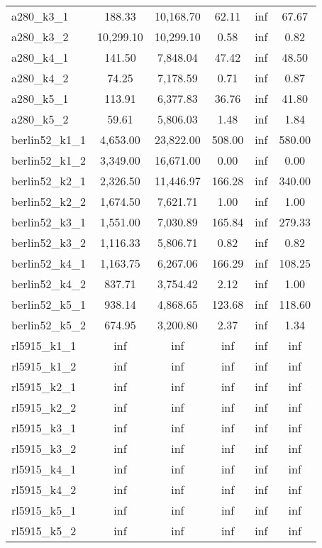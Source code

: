 \documentclass{article}
\begin{document}
\begin{center}
\begin{tabular}{|l|c|c|c|c|c|}
a280\_k3\_1 & 188.33 & 10,168.70 & 62.11 & inf & 67.67 \\
a280\_k3\_2 & 10,299.10 & 10,299.10 & 0.58 & inf & 0.82 \\
a280\_k4\_1 & 141.50 & 7,848.04 & 47.42 & inf & 48.50 \\
a280\_k4\_2 & 74.25 & 7,178.59 & 0.71 & inf & 0.87 \\
a280\_k5\_1 & 113.91 & 6,377.83 & 36.76 & inf & 41.80 \\
a280\_k5\_2 & 59.61 & 5,806.03 & 1.48 & inf & 1.84 \\
berlin52\_k1\_1 & 4,653.00 & 23,822.00 & 508.00 & inf & 580.00 \\
berlin52\_k1\_2 & 3,349.00 & 16,671.00 & 0.00 & inf & 0.00 \\
berlin52\_k2\_1 & 2,326.50 & 11,446.97 & 166.28 & inf & 340.00 \\
berlin52\_k2\_2 & 1,674.50 & 7,621.71 & 1.00 & inf & 1.00 \\
berlin52\_k3\_1 & 1,551.00 & 7,030.89 & 165.84 & inf & 279.33 \\
berlin52\_k3\_2 & 1,116.33 & 5,806.71 & 0.82 & inf & 0.82 \\
berlin52\_k4\_1 & 1,163.75 & 6,267.06 & 166.29 & inf & 108.25 \\
berlin52\_k4\_2 & 837.71 & 3,754.42 & 2.12 & inf & 1.00 \\
berlin52\_k5\_1 & 938.14 & 4,868.65 & 123.68 & inf & 118.60 \\
berlin52\_k5\_2 & 674.95 & 3,200.80 & 2.37 & inf & 1.34 \\
rl5915\_k1\_1 & inf & inf & inf & inf & inf \\
rl5915\_k1\_2 & inf & inf & inf & inf & inf \\
rl5915\_k2\_1 & inf & inf & inf & inf & inf \\
rl5915\_k2\_2 & inf & inf & inf & inf & inf \\
rl5915\_k3\_1 & inf & inf & inf & inf & inf \\
rl5915\_k3\_2 & inf & inf & inf & inf & inf \\
rl5915\_k4\_1 & inf & inf & inf & inf & inf \\
rl5915\_k4\_2 & inf & inf & inf & inf & inf \\
rl5915\_k5\_1 & inf & inf & inf & inf & inf \\
rl5915\_k5\_2 & inf & inf & inf & inf & inf \\
\hline
\end{tabular}
\end{center}
\end{document}
